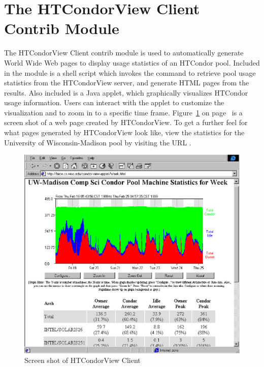 \section{\label{sec:HTCondorView-Client-Install}
The HTCondorView Client Contrib Module} 

The HTCondorView Client contrib module is used to automatically generate
World Wide Web pages to display usage statistics of an HTCondor
pool.
Included in the module is a shell script which invokes the 
command to retrieve pool usage statistics from the HTCondorView server, and
generate HTML pages from the results.  
Also included is a Java applet, which graphically visualizes HTCondor 
usage information.  
Users can interact with the applet to customize the visualization and to
zoom in to a specific time frame.
Figure~\ref{fig:view-screenshot} on page~\pageref{fig:view-screenshot}
is a screen shot of a web page created by HTCondorView.  
To get a further feel for what pages generated by HTCondorView look like,
view the statistics for the University of Wisconsin-Madison pool 
by visiting the URL 
.

\begin{figure}[hbt]
\centering
\includegraphics{contrib/view-screenshot.ps}
\caption{\label{fig:view-screenshot}Screen shot of HTCondorView Client}
\end{figure}

